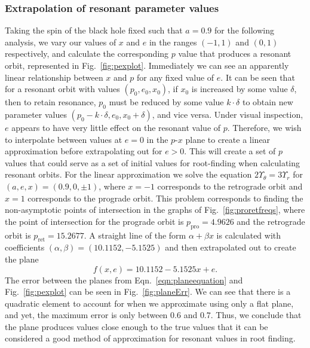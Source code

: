 \subsubsection{Extrapolation of resonant parameter values}
Taking the spin of the black hole fixed such that $a=0.9$ for the following analysis, we vary our values of $x$ and $e$ in the ranges $(-1,1)$ and $(0,1)$ respectively, and calculate the corresponding $p$ value that produces a resonant orbit, represented in Fig.~\eqref{fig:pexplot}.
Immediately we can see an apparently linear relationship between $x$ and $p$ for any fixed value of $e$.
It can be seen that for a resonant orbit with values $(p_0,e_0,x_0)$, if $x_0$ is increased by some value $\delta$, then to retain resonance, $p_0$ must be reduced by some value $k\cdot\delta$ to obtain new parameter values $(p_0-k\cdot\delta,e_0,x_0+\delta)$, and vice versa.
Under visual inspection, $e$ appears to have very little effect on the resonant value of $p$.
Therefore, we wish to interpolate between values at $e=0$ in the $p$-$x$ plane to create a linear approximation before extrapolating out for $e>0$.
This will create a set of $p$ values that could serve as a set of initial values for root-finding when calculating resonant orbits.
For the linear approximation we solve the equation $2\Upsilon_\theta=3\Upsilon_r$ for $(a,e,x)=(0.9,0,\pm 1)$, where $x=-1$ corresponds to the retrograde orbit and $x=1$ corresponds to the prograde orbit.
This problem corresponds to finding the non-asymptotic points of intersection in the graphs of Fig.~\eqref{fig:proretfreqs}, where the point of intersection for the prograde orbit is $p_\text{pro}=4.9626$ and the retrograde orbit is $p_\text{ret}=15.2677$.
A straight line of the form $\alpha+\beta x$ is calculated with coefficients $(\alpha,\beta)=(10.1152,-5.1525)$ and then extrapolated out to create the plane
\begin{equation}\label{eqn:planeequation}
    f(x,e)=10.1152-5.1525x+e.
\end{equation}
The error between the planes from Eqn.~\eqref{eqn:planeequation} and Fig.~\eqref{fig:pexplot} can be seen in Fig.~\eqref{fig:planeErr}.
We can see that there is a quadratic element to account for when we approximate using only a flat plane, and yet, the maximum error is only between $0.6$ and $0.7$.
Thus, we conclude that the plane produces values close enough to the true values that it can be considered a good method of approximation for resonant values in root finding.

